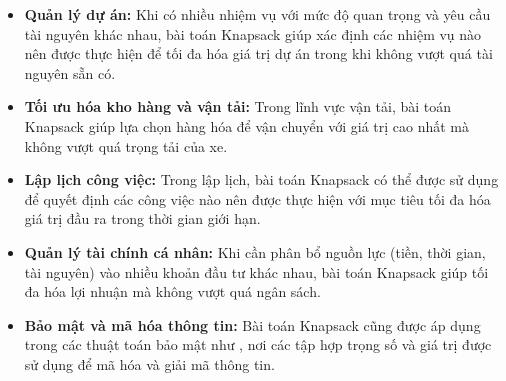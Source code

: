 \begin{itemize}
    \item \textbf{Quản lý dự án:} Khi có nhiều nhiệm vụ với mức độ quan trọng và yêu cầu tài nguyên khác nhau, bài toán Knapsack giúp xác định các nhiệm vụ nào nên được thực hiện để tối đa hóa giá trị dự án trong khi không vượt quá tài nguyên sẵn có.
    \item \textbf{Tối ưu hóa kho hàng và vận tải:} Trong lĩnh vực vận tải, bài toán Knapsack giúp lựa chọn hàng hóa để vận chuyển với giá trị cao nhất mà không vượt quá trọng tải của xe.
    \item \textbf{Lập lịch công việc:} Trong lập lịch, bài toán Knapsack có thể được sử dụng để quyết định các công việc nào nên được thực hiện với mục tiêu tối đa hóa giá trị đầu ra trong thời gian giới hạn.
    \item \textbf{Quản lý tài chính cá nhân:} Khi cần phân bổ nguồn lực (tiền, thời gian, tài nguyên) vào nhiều khoản đầu tư khác nhau, bài toán Knapsack giúp tối đa hóa lợi nhuận mà không vượt quá ngân sách.
    \item \textbf{Bảo mật và mã hóa thông tin:} Bài toán Knapsack cũng được áp dụng trong các thuật toán bảo mật như , nơi các tập hợp trọng số và giá trị được sử dụng để mã hóa và giải mã thông tin.
\end{itemize}